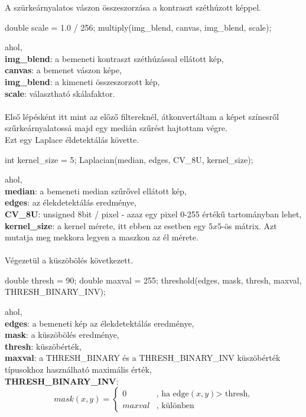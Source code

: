 A szürkeárnyalatos vászon összeszorzása a kontraszt széthúzott képpel.
\begin{cpp}
double scale = 1.0 / 256;
multiply(img_blend, canvas, img_blend, scale);
\end{cpp}
ahol, \\
\indent \textbf{img\_blend}: a bemeneti kontraszt széthúzással ellátott kép,\\
\indent \textbf{canvas}: a bemenet vászon képe,\\
\indent \textbf{img\_blend}: a kimeneti összeszorzott kép,\\
\indent \textbf{scale}: választható skálafaktor.\\\\
Első lépésként itt mint az előző filtereknél, átkonvertáltam a képet színesről szűrkeárnyalatossá majd egy medián szűrést hajtottam végre.\\
Ezt egy Laplace éldetektálás követte.
\begin{cpp}
int kernel_size = 5;  
Laplacian(median, edges, CV_8U, kernel_size);
\end{cpp}
 ahol, \\
\indent \textbf{median}: a bemeneti median szűrővel ellátott kép,\\
\indent \textbf{edges}: az élekdetektálás eredménye,\\
\indent \textbf{CV\_8U}: unsigned 8bit / pixel - azaz egy pixel 0-255 értékű tartományban lehet,\\
\indent \textbf{kernel\_size}: a kernel mérete, itt ebben az esetben egy $5 x 5$-ös mátrix. Azt mutatja meg mekkora legyen a maszkon az él mérete.\\ \\
Végezetül a küszöbölés következett.
\begin{cpp}
double thresh = 90;
double maxval = 255;
threshold(edges, mask, thresh, maxval, THRESH_BINARY_INV);
\end{cpp}
 ahol, \\
\indent \textbf{edges}: a bemeneti kép az élekdetektálás eredménye,\\
\indent \textbf{mask}: a küszöbölés eredménye,\\
\indent \textbf{thresh}: küszöbérték,\\
\indent \textbf{maxval}: a THRESH\_BINARY és a THRESH\_BINARY\_INV küszöbérték típusokhoz használható maximális érték,\\
\indent \textbf{THRESH\_BINARY\_INV}:
 \[
 mask(x,y)=\left\{
 \begin{array}{ll}
 0 & \mbox{, ha edge$(x,y)$> thresh,}\\
 maxval & \mbox{, különben}
 \end{array}
 \right.
\]
